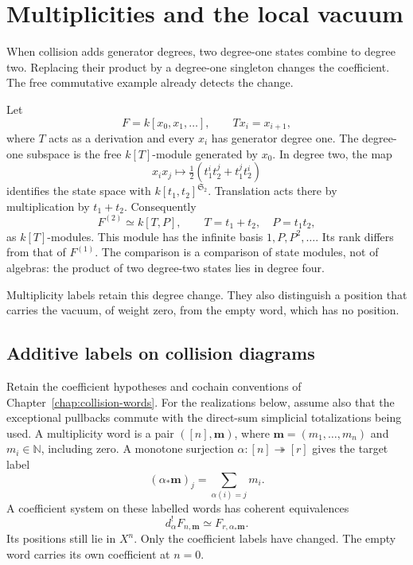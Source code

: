 \chapter{Multiplicities and the local vacuum}
\label{chap:collision-vacuum}

When collision adds generator degrees, two degree-one states combine
to degree two.  Replacing their product by a degree-one singleton
changes the coefficient.
The free commutative example already detects the change.

Let
\[
 F=k[x_0,x_1,\ldots],\qquad Tx_i=x_{i+1},
\]
where \(T\) acts as a derivation and every \(x_i\) has generator
degree one.  The degree-one subspace is the free \(k[T]\)-module
generated by \(x_0\).  In degree two, the map
\[
 x_i x_j\longmapsto
 \tfrac12(t_1^it_2^j+t_1^jt_2^i)
\]
identifies the state space with \(k[t_1,t_2]^{\mathfrak S_2}\).
Translation acts there by multiplication by \(t_1+t_2\).  Consequently
\begin{equation}
 F^{(2)}\simeq k[T,P],\qquad T=t_1+t_2,\quad P=t_1t_2,
 \label{eq:vacuum-weight-two}
\end{equation}
as \(k[T]\)-modules.  This module has the infinite basis
\(1,P,P^2,\ldots\).  Its rank differs from that of \(F^{(1)}\).
The comparison is a comparison of state modules, not of algebras:
the product of two degree-two states lies in degree four.

Multiplicity labels retain this degree change.  They also distinguish
a position that carries the vacuum, of weight zero, from the empty
word, which has no position.

\section{Additive labels on collision diagrams}

Retain the coefficient hypotheses and cochain conventions of
Chapter~\ref{chap:collision-words}.  For the realizations below,
assume also that the exceptional pullbacks commute with the
direct-sum simplicial totalizations being used.  A multiplicity
word is a pair
\(([n],\mathbf m)\), where \(\mathbf m=(m_1,\ldots,m_n)\) and
\(m_i\in\mathbb N\), including zero.  A monotone surjection
\(\alpha:[n]\twoheadrightarrow[r]\) gives the target label
\[
 (\alpha_*\mathbf m)_j=\sum_{\alpha(i)=j}m_i.
\]
A coefficient system on these labelled words has coherent
equivalences
\[
 d_\alpha^!F_{n,\mathbf m}\simeq F_{r,\alpha_*\mathbf m}.
\]
Its positions still lie in \(X^n\).  Only the coefficient labels
have changed.  The empty word carries its own coefficient at
\(n=0\).

